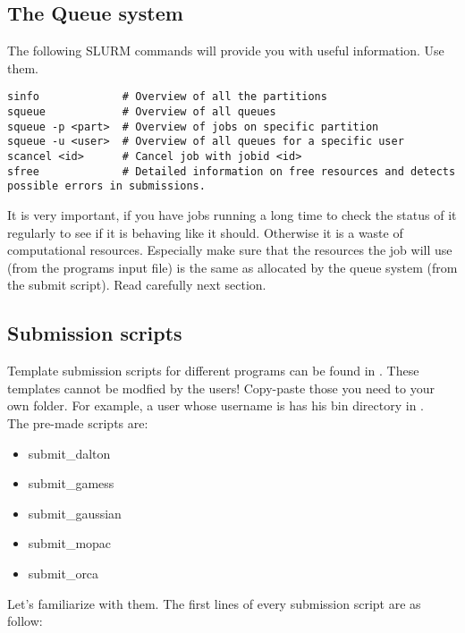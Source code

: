 \documentclass{article}
\begin{document}
\subsection*{The Queue system}

The following SLURM commands will provide you with useful information. Use them.

\begin{lstlisting}
sinfo             # Overview of all the partitions
squeue            # Overview of all queues
squeue -p <part>  # Overview of jobs on specific partition
squeue -u <user>  # Overview of all queues for a specific user
scancel <id>      # Cancel job with jobid <id>
sfree             # Detailed information on free resources and detects possible errors in submissions.
\end{lstlisting}


It is very important, if you have jobs running a long time to check the status of it regularly to see if it is behaving like it should.
Otherwise it is a waste of computational resources.
Especially make sure that the resources the job will use (from the programs input file) is the same as allocated by the queue system (from the submit script). Read carefully next section.\\

\subsection*{Submission scripts}

Template submission scripts for different programs can be found in . These templates cannot be modfied by the users!
Copy-paste those you need to your own  folder. For example, a user whose username is  has his bin directory in .\\

The pre-made scripts are:

\begin{itemize}
\item{submit\_dalton}
\item{submit\_gamess}
\item{submit\_gaussian}
\item{submit\_mopac}
\item{submit\_orca}
\end{itemize}

Let's familiarize with them. The first lines of every submission script are as follow:
\end{document}
